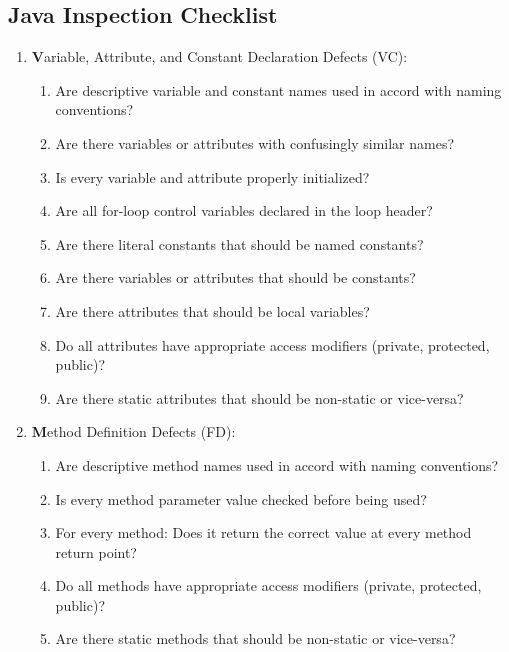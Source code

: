 \subsection{Java Inspection Checklist}
\begin{enumerate}
\item {\textbf Variable, Attribute, and Constant Declaration Defects (VC):}
\begin{enumerate}
\item Are descriptive variable and constant names used in accord with naming
  conventions?
\item Are there variables or attributes with confusingly similar names?
\item Is every variable and attribute properly initialized?
\item Are all for-loop control variables declared in the loop header?
\item Are there literal constants that should be named constants?
\item Are there variables or attributes that should be constants?
\item Are there attributes that should be local variables?
\item Do all attributes have appropriate access modifiers (private, protected,
  public)?
\item Are there static attributes that should be non-static or vice-versa?
\end{enumerate}
\ifslides
\newpage
\fi
\item {\textbf Method Definition Defects (FD):}
  \begin{enumerate}
  \item Are descriptive method names used in accord with naming conventions?
  \item Is every method parameter value checked before being used?
  \item For every method: Does it return the correct value at every method
  return point?
  \item Do all methods have appropriate access modifiers (private, protected,
  public)?
  \item Are there static methods that should be non-static or vice-versa?
  \end{enumerate}

\end{enumerate}
